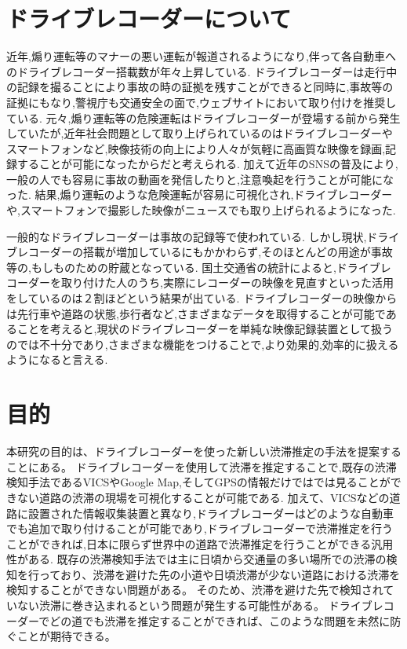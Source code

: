 \section{ドライブレコーダーについて}
近年,煽り運転等のマナーの悪い運転が報道されるようになり,伴って各自動車へのドライブレコーダー搭載数が年々上昇している.
ドライブレコーダーは走行中の記録を撮ることにより事故の時の証拠を残すことができると同時に,事故等の証拠にもなり,警視庁も交通安全の面で,ウェブサイトにおいて取り付けを推奨している.
元々,煽り運転等の危険運転はドライブレコーダーが登場する前から発生していたが,近年社会問題として取り上げられているのはドライブレコーダーやスマートフォンなど,映像技術の向上により人々が気軽に高画質な映像を録画,記録することが可能になったからだと考えられる.
加えて近年のSNSの普及により,一般の人でも容易に事故の動画を発信したりと,注意喚起を行うことが可能になった.
結果,煽り運転のような危険運転が容易に可視化され,ドライブレコーダーや,スマートフォンで撮影した映像がニュースでも取り上げられるようになった.

一般的なドライブレコーダーは事故の記録等で使われている.
しかし現状,ドライブレコーダーの搭載が増加しているにもかかわらず,そのほとんどの用途が事故等の,もしものための貯蔵となっている.
国土交通省の統計によると,ドライブレコーダーを取り付けた人のうち,実際にレコーダーの映像を見直すといった活用をしているのは２割ほどという結果が出ている\cite{ministryofland}.
ドライブレコーダーの映像からは先行車や道路の状態,歩行者など,さまざまなデータを取得することが可能であることを考えると,現状のドライブレコーダーを単純な映像記録装置として扱うのでは不十分であり,さまざまな機能をつけることで,より効果的,効率的に扱えるようになると言える.


%
%

\section{目的}
本研究の目的は、ドライブレコーダーを使った新しい渋滞推定の手法を提案することにある。
ドライブレコーダーを使用して渋滞を推定することで,既存の渋滞検知手法であるVICSやGoogle Map,そしてGPSの情報だけではでは見ることができない道路の渋滞の現場を可視化することが可能である.
加えて、VICSなどの道路に設置された情報収集装置と異なり,ドライブレコーダーはどのような自動車でも追加で取り付けることが可能であり,ドライブレコーダーで渋滞推定を行うことができれば,日本に限らず世界中の道路で渋滞推定を行うことができる汎用性がある.
既存の渋滞検知手法では主に日頃から交通量の多い場所での渋滞の検知を行っており、渋滞を避けた先の小道や日頃渋滞が少ない道路における渋滞を検知することができない問題がある。
そのため、渋滞を避けた先で検知されていない渋滞に巻き込まれるという問題が発生する可能性がある。
ドライブレコーダーでどの道でも渋滞を推定することができれば、このような問題を未然に防ぐことが期待できる。

